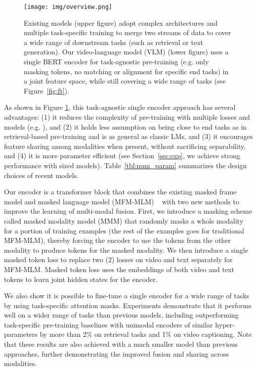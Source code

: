 \documentclass[11pt,a4paper]{article}
\begin{document}
\begin{figure}[t]
\centering    
\texttt{[image: img/overview.png]}
    \caption{Existing models (upper figure) adopt complex architectures and multiple task-specific training to merge two streams of data to cover a wide range of downstream tasks (such as retrieval or text generation). Our video-language model (VLM) (lower figure) uses a single BERT encoder for task-agnostic pre-training (e.g. only masking tokens, no matching or alignment for specific end tasks) in a joint feature space, while still covering a wide range of tasks (see Figure~\ref{fig:ft}).}
\vspace{-4mm}
\label{fig:overview}
\end{figure}

As shown in Figure \ref{fig:overview},
this task-agnostic single encoder approach has several advantages:
(1) it reduces the complexity of pre-training with multiple losses and models (e.g. \citet{luo2020univilm}), and
(2) it holds less assumption on being close to end tasks as in retrieval-based pre-training \citet{miech2020end} and is as general as classic LMs, and
(3) it encourages feature sharing among modalities when present, without sacrificing separability, and (4) it is more parameter efficient (see Section~\ref{sec:exp}, we achieve strong performance with  sized models).
Table~\ref{tbl:num_param} summarizes the design choices of recent models. 

Our encoder is a transformer block that combines the existing masked frame model and masked language model (MFM-MLM) ~\cite{sun2019contrastive,li-etal-2020-hero,luo2020univilm}
with two new methods to improve the learning of multi-modal fusion. First, we introduce a masking scheme called masked modality model (MMM) that randomly masks a whole modality for a portion of training examples (the rest of the examples goes for traditional MFM-MLM), thereby forcing the encoder to use the tokens from the other modality to produce tokens for the masked modality. 
We then introduce a single masked token loss to replace two (2) losses on video and text separately for MFM-MLM.
Masked token loss uses the embeddings of both video and text tokens to learn joint hidden states for the encoder.


We also show it is possible to fine-tune a single encoder for a wide range of tasks by using task-specific attention masks. 
Experiments demonstrate that it performs well on a wider range of tasks than previous models, including outperforming task-specific pre-training baselines with unimodal encoders of similar hyper-parameters by more than 2\% on retrieval tasks and 1\% on video captioning. 
Note that these results are also achieved with a much smaller model than previous approaches, further demonstrating the improved fusion and sharing across modalities. 
\end{document}
